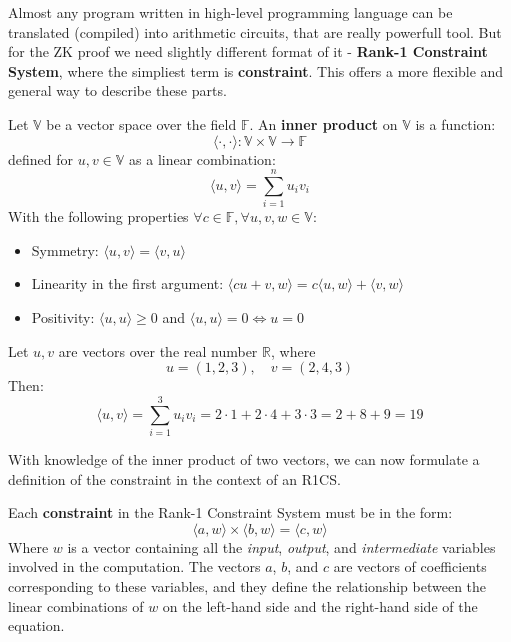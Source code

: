 \documentclass[../lecture-notes.tex]{subfiles}
\begin{document}
Almost any program written in high-level programming language can be translated (compiled) into
arithmetic circuits, that are really powerfull tool. But for the ZK proof we need slightly different
format of it - \textbf{Rank-1 Constraint System}, where the simpliest term is \textbf{constraint}. 
This offers a more flexible and general way to describe these parts.
    
\begin{definition}
    Let $\mathbb{V}$ be a vector space over the field $\mathbb{F}$. An \textbf{inner product} 
    on $\mathbb{V}$ is a function:
    \[ \langle \cdot, \cdot \rangle: \mathbb{V} \times \mathbb{V} \rightarrow \mathbb{F} \]
    defined for $u, v \in \mathbb{V}$ as a linear combination:
    \[ \langle u, v \rangle = \sum_{i=1}^{n} u_i v_i \]
    With the following properties $\forall c \in \mathbb{F}, \forall u, v, w \in \mathbb{V}$:
    \begin{itemize}
        \item Symmetry: $\langle u, v \rangle = \langle v, u \rangle$
        \item Linearity in the first argument: $\langle cu + v, w \rangle = c \langle u, w \rangle + \langle v, w \rangle$
        \item Positivity: $\langle u, u \rangle \geq 0$ and $\langle u, u \rangle = 0 \Leftrightarrow u = 0$
    \end{itemize}
\end{definition}


\begin{example}
    Let $u, v$ are vectors over the real number $\mathbb{R}$, where
    \begin{equation*}
        u = (1, 2, 3), \quad v = (2, 4, 3)
    \end{equation*}
    Then: 
    \begin{equation*}
        \langle u, v\rangle = \sum_{i=1}^{3}u_iv_i = 2 \cdot 1 + 2 \cdot 4 + 3 \cdot 3 = 2 + 8 + 9 = 19
    \end{equation*}
\end{example}

With knowledge of the inner product of two vectors, we can now formulate a definition of the 
constraint in the context of an R1CS.

\begin{definition}
    Each \textbf{constraint} in the Rank-1 Constraint System must be in the form:
    \begin{equation*}
        \langle a, w\rangle \times \langle b, w\rangle = \langle c, w\rangle
    \end{equation*}
    Where $w$ is a vector containing all the \textit{input}, \textit{output}, and 
    \textit{intermediate} variables involved in the computation. The vectors $a$, 
    $b$, and $c$ are vectors of coefficients corresponding to these variables, 
    and they define the relationship between the linear combinations of $w$ on the 
    left-hand side and the right-hand side of the equation.
\end{definition}
\end{document}
